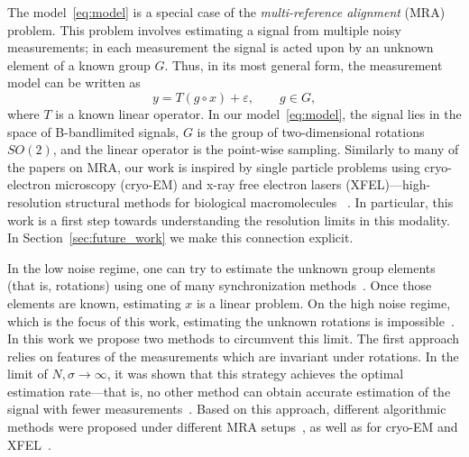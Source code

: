 \documentclass[english,12pt]{article}
\numberwithin{equation}{section}
\numberwithin{thm}{section} %
\begin{document}
The model~\eqref{eq:model} is a special case of the \emph{multi-reference alignment} (MRA) problem. This problem involves estimating a signal from multiple noisy measurements; in each measurement the signal is acted upon by an unknown element of a known group $G$. 
Thus, in its most general form, the measurement model can be written as 
\begin{equation}
y = T(g\circ x) +\varepsilon, \qquad g\in G,
\end{equation}
where $T$ is a known linear operator. 
In our model~\eqref{eq:model}, the signal lies in the space of B-bandlimited signals, $G$ is the group of two-dimensional rotations $SO(2)$, and the linear operator is the point-wise sampling.
Similarly to many of the papers on MRA, our work is inspired by single particle problems using cryo-electron microscopy (cryo-EM) and x-ray free electron lasers (XFEL)---high-resolution structural methods for biological macromolecules  ~\cite{frank2006three,kuhlbrandt2014resolution,singer2018mathematics}. 
In particular, this work is a first step towards understanding the resolution limits in this modality. In Section~\ref{sec:future_work} we make this connection explicit.

In the low noise regime, one can try to estimate the unknown group elements (that is, rotations) using one of many synchronization methods~\cite{singer2011angular,bandeira2015non,boumal2016nonconvex,chen2018projected,singer2011three}.
Once those elements are known, estimating $x$ is a linear problem. 
On the high noise regime, which is the focus of this work, estimating the unknown rotations is impossible~\cite{bendory2018toward,aguerrebere2016fundamental}.
In this work we propose two methods to circumvent this limit. 
The first approach relies on features of the measurements which are invariant 
under rotations. In the limit of $N,\sigma\to\infty$, it was shown that this strategy achieves the optimal  estimation rate---that is, no other method can obtain accurate estimation of the signal with fewer measurements~\cite{bandeira2017optimal,bandeira2017estimation,abbe2018multireference,abbe2018estimation}. Based on this approach, different algorithmic methods were proposed under different MRA setups~\cite{bendory2017bispectrum,perry2017sample,abbe2018multireference,boumal2018heterogeneous,chen2018spectral,ma2018heterogeneous,bandeira2014multireference}, as well as for  cryo-EM and XFEL~\cite{kam1980reconstruction,liu2013three,kurta2017correlations,levin20173d,bendory2018toward,pande2018ab,von2018structure}. 
\end{document}
